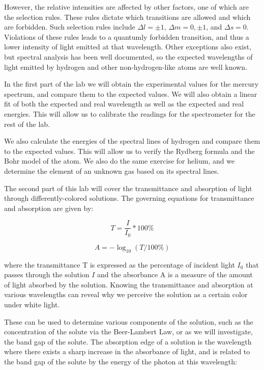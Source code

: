 However, the relative intensities are affected by other factors, one of which are the selection rules. These rules dictate which transitions are allowed and which are forbidden. Such selection rules include $\Delta l = \pm 1$, $\Delta m = 0, \pm 1$, and $\Delta s = 0$. Violations of these rules leads to a quantumly forbidden transition, and thus a lower intensity of light emitted at that wavelength. Other exceptions also exist, but spectral analysis has been well documented, so the expected wavelengths of light emitted by hydrogen and other non-hydrogen-like atoms are well known.


In the first part of the lab we will obtain the experimental values for the mercury spectrum, and compare them to the expected values. We will also obtain a linear fit of both the expected and real wavelength as well as the expected and real energies.
This will allow us to calibrate the readings for the spectrometer for the rest of the lab.

We also calculate the energies of the spectral lines of hydrogen and compare them to the expected values. This will allow us to verify the Rydberg formula and the Bohr model of the atom.
We also do the same exercise for helium, and we determine the element of an unknown gas based on its spectral lines.



The second part of this lab will cover the transmittance and absorption of light through differently-colored solutions. The governing equations for transmittance and absorption are given by:

\begin{equation}
   T = \frac{I}{I_0} * 100\%
\end{equation}

\begin{equation}
   A = -\log_{10}(T/100\%)
   \label{eq:absorbance}
\end{equation}

where the transmittance T is expressed as the percentage of incident light $I_0$ that passes through the solution $I$ and the absorbance A is a measure of the amount of light absorbed by the solution. Knowing the transmittance and absorption at various wavelengths can reveal why we perceive the solution as a certain color under white light.

These can be used to determine various components of the solution, such as the concentration of the solute via the Beer-Lambert Law, or as we will investigate, the band gap of the solute. The absorption edge of a solution is the wavelength where there exists a sharp increase in the absorbance of light, and is related to the band gap of the solute by the energy of the photon at this wavelength:

